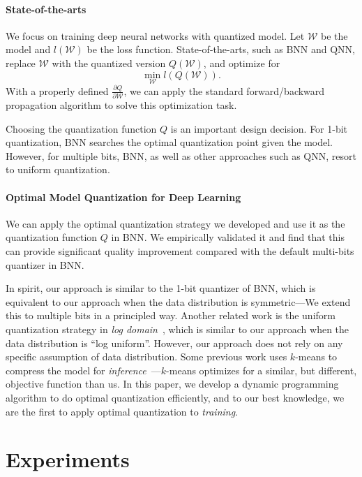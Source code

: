 \documentclass{article}
\begin{document}
\paragraph*{State-of-the-arts} We focus on
training deep neural networks with quantized
model. Let $\mathcal{W}$ be the model and 
$l(\mathcal{W})$ be the loss function. State-of-the-arts,
such as BNN and QNN, replace $\mathcal{W}$
with the quantized version $Q(\mathcal{W})$, and optimize
for
\[
\min_{\mathcal{W}} l(Q(\mathcal{W})).
\]
With a properly defined 
$\frac{\partial Q}{\partial{\mathcal{W}}}$, we can
apply the standard forward/backward propagation 
algorithm to solve this optimization task.

Choosing the quantization function $Q$ is
an important design decision. For 1-bit quantization,
BNN searches the optimal quantization point given
the model. However, for multiple bits,
BNN, as well as other approaches such as QNN, resort
to uniform quantization.

\paragraph*{Optimal Model Quantization for Deep Learning}

We can apply the optimal quantization strategy we
developed and use it as the quantization function $Q$
in BNN. We empirically validated it 
and find that this can provide significant quality improvement
compared with the default multi-bits quantizer in BNN. 

In spirit, our approach is similar to the 1-bit quantizer of
BNN, which is equivalent to our approach when the data
distribution is symmetric---We extend this
to multiple bits in a principled way. Another related work
is the uniform quantization strategy 
in {\em log domain}~\cite{miyashita2016convolutional},
which is similar to our approach when the data distribution
is ``log uniform''. However, our approach does not rely on
any specific assumption of data distribution.
Some previous work uses $k$-means to
compress the model for {\em inference}~\cite{XXX}---$k$-means
optimizes for a similar, but different, objective
function than us. In this paper, we 
develop a dynamic
programming algorithm to do optimal quantization efficiently,
and to our best knowledge, we
are the first to apply optimal quantization to
{\em training}.




\section{Experiments} \label{sec:exp}
\end{document}
